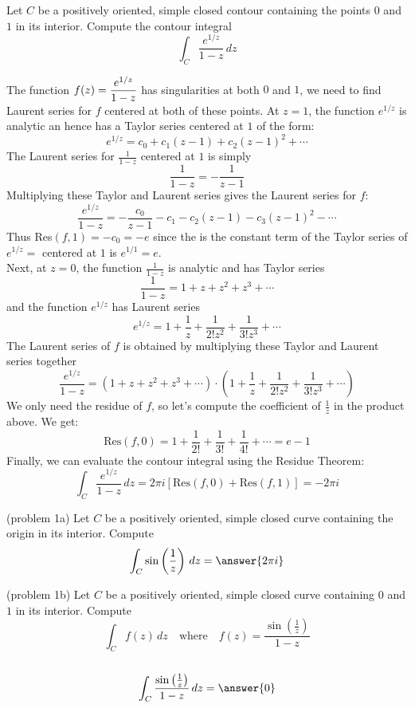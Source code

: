 \documentclass[handout]{ximera}
\begin{document}
\begin{example}[example 1b]
Let $C$ be a positively oriented, simple closed contour containing the points $0$ and $1$ in its interior.
Compute the contour integral
\[
\int_C \frac{e^{1/z}}{1-z} \, dz
\]

The function $\displaystyle f(z) = \frac{e^{1/z}}{1-z}$ has singularities at both $0$ and $1$, we need to find Laurent series for $f$
centered at both of these points.
At $z = 1$, the function $e^{1/z}$ is analytic an hence has a Taylor series centered at $1$ of the form:
\[
e^{1/z} = c_0 + c_1(z-1) + c_2(z-1)^2 + \cdots
\]
The Laurent series for $\frac{1}{1-z}$ centered at $1$ is simply
\[
\frac{1}{1-z} = -\frac{1}{z-1}
\]
Multiplying these Taylor and Laurent series gives the Laurent series for $f$:
\[
\frac{e^{1/z}}{1-z} = -\frac{c_0}{z-1} -c_1 -c_2(z-1) - c_3(z-1)^2 - \cdots
\]
Thus Res$(f, 1) = -c_0 = -e$ since the is the constant term of the Taylor series of $e^{1/z} =$ centered at $1$ is $e^{1/1} =e$.\\
Next, at $z = 0$, the function $\frac{1}{1-z}$ is analytic and has Taylor series
\[
\frac{1}{1-z} = 1 + z + z^2 + z^3 + \cdots
\]
and the function $e^{1/z}$ has Laurent series
\[
e^{1/z} = 1 + \frac{1}{z} + \frac{1}{2! z^2} + \frac{1}{3! z^3} + \cdots
\]
The Laurent series of $f$ is obtained by multiplying these Taylor and Laurent series together
\[
\frac{e^{1/z}}{1-z} = \left(1 + z + z^2 + z^3 + \cdots\right) \cdot \left( 1 + \frac{1}{z} + \frac{1}{2! z^2} + \frac{1}{3! z^3} + \cdots\right)
\]
We only need the residue of $f$, so let's compute the coefficient of $\frac{1}{z}$ in the product above.
We get:
\[
\text{Res}(f, 0) = 1 + \frac{1}{2!} +\frac{1}{3!} + \frac{1}{4!} + \cdots = e-1
\]
Finally, we can evaluate the contour integral using the Residue Theorem:
\[
\int_C \frac{e^{1/z}}{1-z} \, dz = 2\pi i \left[\text{Res}(f,0) + \text{Res}(f,1)\right] = -2\pi i
\]
\end{example}


\begin{problem}(problem 1a)
Let $C$ be a positively oriented, simple closed curve containing the origin in its interior. Compute
\[
\int_C \sin\left(\frac{1}{z}\right) \, dz = \answer{2\pi i}
\]

\end{problem}

\begin{problem}(problem 1b)
Let $C$ be a positively oriented, simple closed curve containing $0$ and $1$ in its interior. Compute
\[
\int_C f(z) \, dz \quad \text{where} \quad f(z) = \frac{\sin\left(\frac{1}{z}\right)}{1-z}
\]
{}\\
\[
 \int_C \frac{\sin\left(\frac{1}{z}\right)}{1-z} \, dz = \answer{0}
 \]

\end{problem}
\end{document}
